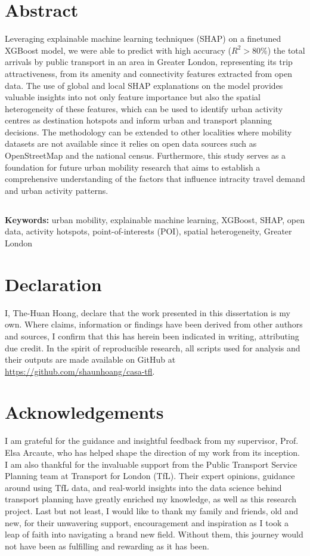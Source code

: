 \chapter*{Abstract}
Leveraging explainable machine learning techniques (SHAP) on a finetuned XGBoost model, we were able to predict with high accuracy ($R^2>80\%$) the total arrivals by public transport in an area in Greater London, representing its trip attractiveness, from its amenity and connectivity features extracted from open data. The use of global and local SHAP explanations on the model provides valuable insights into not only feature importance but also the spatial heterogeneity of these features, which can be used to identify urban activity centres as destination hotspots and inform urban and transport planning decisions. The methodology can be extended to other localities where mobility datasets are not available since it relies on open data sources such as OpenStreetMap and the national census. Furthermore, this study serves as a foundation for future urban mobility research that aims to establish a comprehensive understanding of the factors that influence intracity travel demand and urban activity patterns.

\section*{}
\textbf{Keywords:} urban mobility, explainable machine learning, XGBoost, SHAP, open data, activity hotspots, point-of-interests (POI), spatial heterogeneity, Greater London

\chapter*{Declaration}
I, The-Huan Hoang, declare that the work presented in this dissertation is my own. Where claims, information or findings have been derived from other authors and sources, I confirm that this has herein been indicated in writing, attributing due credit. In the spirit of reproducible research, all scripts used for analysis and their outputs are made available on GitHub at \url{https://github.com/shaunhoang/casa-tfl}. 

\chapter*{Acknowledgements}
I am grateful for the guidance and insightful feedback from my supervisor, Prof. Elsa Arcaute, who has helped shape the direction of my work from its inception. I am also thankful for the invaluable support from the Public Transport Service Planning team at Transport for London (TfL). Their expert opinions, guidance around using TfL data, and real-world insights into the data science behind transport planning have greatly enriched my knowledge, as well as this research project. Last but not least, I would like to thank my family and friends, old and new, for their unwavering support, encouragement and inspiration as I took a leap of faith into navigating a brand new field. Without them, this journey would not have been as fulfilling and rewarding as it has been.

\tableofcontents

\listoffigures

\listoftables